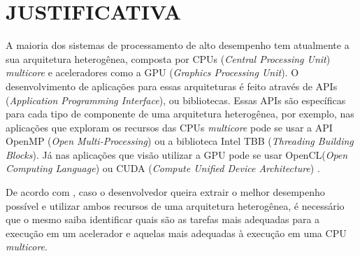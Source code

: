 
\chapter{JUSTIFICATIVA}
\label{chap:justificativa}

A maioria dos sistemas de processamento de alto desempenho tem atualmente a sua arquitetura heterogênea,
composta por CPUs (\textit{Central Processing Unit}) \textit{multicore} e aceleradores como a GPU (\textit{Graphics Processing Unit}).
O desenvolvimento de aplicações para essas arquiteturas é feito através de APIs (\textit{Application Programming Interface}), ou bibliotecas.
Essas APIs são específicas para cada tipo de componente de uma arquitetura heterogênea, por exemplo, nas aplicações que exploram os recursos
das CPUs \textit{multicore} pode se usar a API OpenMP (\textit{Open Multi-Processing}) \cite{openmp:2018} ou a biblioteca
Intel TBB \cite{inteltbb:2018} (\textit{Threading Building Blocks}).
Já nas aplicações que visão utilizar a GPU pode se usar OpenCL(\textit{Open Computing Language}) \cite{opencl:2018} ou CUDA (\textit{Compute Unified Device Architecture}) \cite{cuda:2018}.


De acordo com \cite{intrArqHete:2012}, caso o desenvolvedor queira extrair o melhor desempenho possível e utilizar ambos recursos de uma
arquitetura heterogênea, é necessário que o mesmo saiba identificar quais são as tarefas mais adequadas para a execução em um acelerador
e aquelas mais adequadas à execução em uma CPU \textit{multicore}.